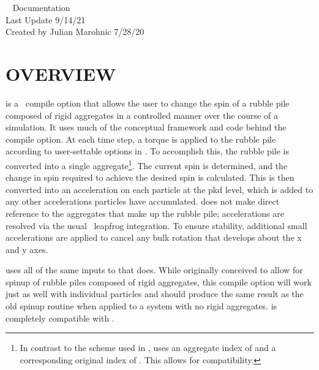 



\begin{flushleft}

\huge{\pkd\  Documentation}\\
\bigskip\bigskip
\Large{Last Update 9/14/21}\\
\bigskip\bigskip
\large{Created by Julian Marohnic 7/28/20}\\

\end{flushleft}

\section{OVERVIEW}

 is a \pkd\ compile option that allows the user to change the spin of a rubble pile composed of rigid aggregates in a controlled manner over the course of a simulation. It uses much of the conceptual framework and code behind the  compile option. At each time step, a torque is applied to the rubble pile according to user-settable options in . To accomplish this, the rubble pile is converted into a single aggregate\footnote{In contrast to the scheme used in ,  uses an aggregate index of  and a corresponding original index of . This allows for  compatibility.}. The current spin is determined, and the change in spin required to achieve the desired spin is calculated. This is then converted into an acceleration on each particle at the pkd level, which is added to any other accelerations particles have accumulated.  does not make direct reference to the aggregates that make up the rubble pile; accelerations are resolved via the usual \pkd\ leapfrog integration. To ensure stability, additional small accelerations are applied to cancel any bulk rotation that develops about the x and y axes. 

 uses all of the same inputs to  that  does. While originally conceived to allow for spinup of rubble piles composed of rigid aggregates, this compile option will work just as well with individual particles and should produce the same result as the old spinup routine when applied to a system with no rigid aggregates.  is completely compatible with . \\

